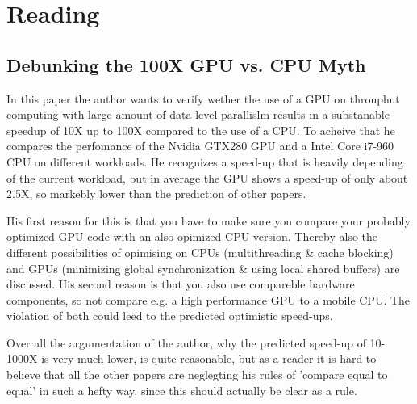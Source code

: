 \documentclass{article}
\newcommand{\enterProblemHeader}[1]{
}
\newcommand{\exitProblemHeader}[1]{
}
\newcounter{homeworkProblemCounter} %
\newcommand{\homeworkProblemName}{}
\newenvironment{homeworkProblem}[1][Problem \arabic{homeworkProblemCounter}]{ %
\stepcounter{homeworkProblemCounter} %
\renewcommand{\homeworkProblemName}{#1} %
\section{\homeworkProblemName} %
}{
}
\begin{document}
\begin{homeworkProblem}[Reading]
\subsection{Debunking the 100X GPU vs. CPU Myth}
In this paper the author wants to verify wether the use of a GPU on throuphut computing with large amount of data-level parallislm results in a substanable speedup of 10X up to 100X compared to the use of a CPU.
 To acheive that he compares the perfomance of the Nvidia GTX280 GPU and a Intel Core i7-960 CPU on different workloads.
  He recognizes a speed-up that is heavily depending of the  current workload, but in average the GPU shows a speed-up of only about 2.5X, so markebly lower than the prediction of other papers.

His first reason for this is that you have to make sure you compare your probably optimized GPU code with an also opimized CPU-version.
Thereby also the different possibilities of opimising on CPUs (multithreading & cache blocking) and GPUs (minimizing global synchronization & using local shared buffers) are discussed.
His second reason is that you also use compareble hardware components, so not compare e.g. a high performance
GPU to a mobile CPU. 
The violation of both could leed to the predicted optimistic speed-ups. 

Over all the argumentation of the author, why the predicted speed-up  of 10-1000X is very much lower, is quite reasonable, but as a reader it is hard to believe that all the other papers are neglegting his rules of 'compare equal to equal' in such a hefty way, since this should actually be clear as a rule.
\end{homeworkProblem}

\end{document}
